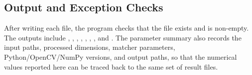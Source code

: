 \subsection{Output and Exception Checks}

After writing each file, the program checks that the file exists and is non-empty. The outputs
include , , ,
, , ,
, and . The parameter summary also records the
input paths, processed dimensions, matcher parameters, Python/OpenCV/NumPy versions, and output
paths, so that the numerical values reported here can be traced back to the same set of result
files.
